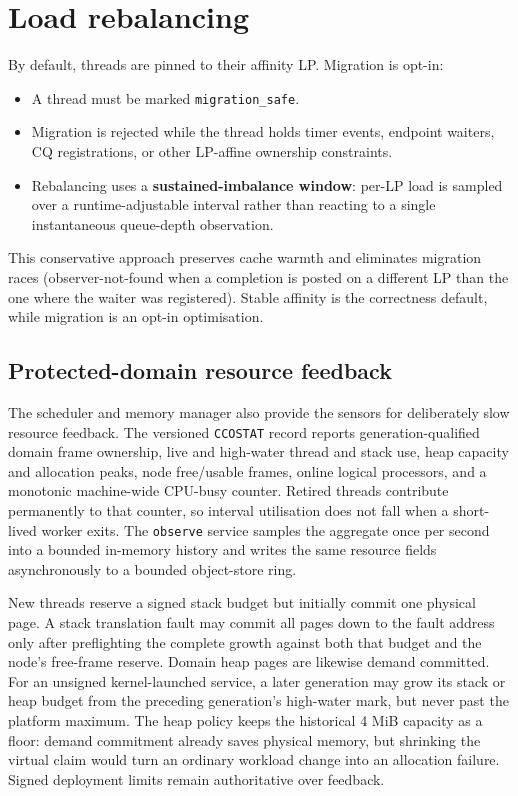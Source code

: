 \section{Load rebalancing}

By default, threads are pinned to their affinity LP. Migration is opt-in:

\begin{itemize}
    \item A thread must be marked \texttt{migration\_safe}.
    \item Migration is rejected while the thread holds timer events, endpoint
        waiters, CQ registrations, or other LP-affine ownership constraints.
    \item Rebalancing uses a \textbf{sustained-imbalance window}: per-LP load is
        sampled over a runtime-adjustable interval rather than reacting to a
        single instantaneous queue-depth observation.
\end{itemize}

This conservative approach preserves cache warmth and eliminates migration races
(observer-not-found when a completion is posted on a different LP than the one
where the waiter was registered). Stable affinity is the correctness default, while
migration is an opt-in optimisation.

\subsection{Protected-domain resource feedback}

The scheduler and memory manager also provide the sensors for deliberately
slow resource feedback. The versioned \texttt{CCOSTAT} record reports
generation-qualified domain frame ownership, live and high-water thread and
stack use, heap capacity and allocation peaks, node free/usable frames, online
logical processors, and a monotonic machine-wide CPU-busy counter. Retired
threads contribute permanently to that counter, so interval utilisation does
not fall when a short-lived worker exits. The \texttt{observe} service samples
the aggregate once per second into a bounded in-memory history and writes the
same resource fields asynchronously to a bounded object-store ring.

New threads reserve a signed stack budget but initially commit one physical
page. A stack translation fault may commit all pages down to the fault address
only after preflighting the complete growth against both that budget and the
node's free-frame reserve. Domain heap pages are likewise demand committed.
For an unsigned kernel-launched service, a later generation may grow its stack
or heap budget from the preceding generation's high-water mark, but never past
the platform maximum. The heap policy keeps the historical 4 MiB capacity as a
floor: demand commitment already saves physical memory, but shrinking the
virtual claim would turn an ordinary workload change into an allocation
failure. Signed deployment limits remain authoritative over feedback.

